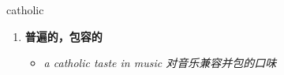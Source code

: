 
\begin{frame}
{\huge catholic}
\begin{center}
\begin{enumerate}\Large
  \item \textbf{普遍的，包容的}
  \begin{itemize}
    \item \em{\Large{a catholic taste in music 对音乐兼容并包的口味}}
  \end{itemize}
\end{enumerate}
\end{center}
\end{frame}
